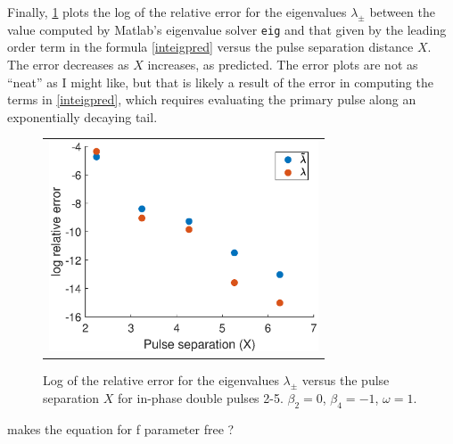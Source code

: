 \documentclass[12pt]{article}
\begin{document}
Finally, \cref{fig:inteigpred} plots the log of the relative error for the eigenvalues $\lambda_\pm$ between the value computed by Matlab's eigenvalue solver \texttt{eig} and that given by the leading order term in the formula \cref{inteigpred} versus the pulse separation distance $X$. The error decreases as $X$ increases, as predicted. The error plots are not as ``neat'' as I might like, but that is likely a result of the error in computing the terms in \cref{inteigpred}, which requires evaluating the primary pulse along an exponentially decaying tail.

\begin{figure}[H]
\centering
\begin{tabular}{c}
\includegraphics[width=8cm]{images/inteigpred.eps}
\end{tabular}
\caption{Log of the relative error for the eigenvalues $\lambda_\pm$ versus the pulse separation $X$ for in-phase double pulses 2-5. $\beta_2 = 0$, $\beta_4 = -1$, $\omega = 1$.}
\label{fig:inteigpred}
\end{figure}

 makes the equation for f parameter free ?

% 

\end{document}
